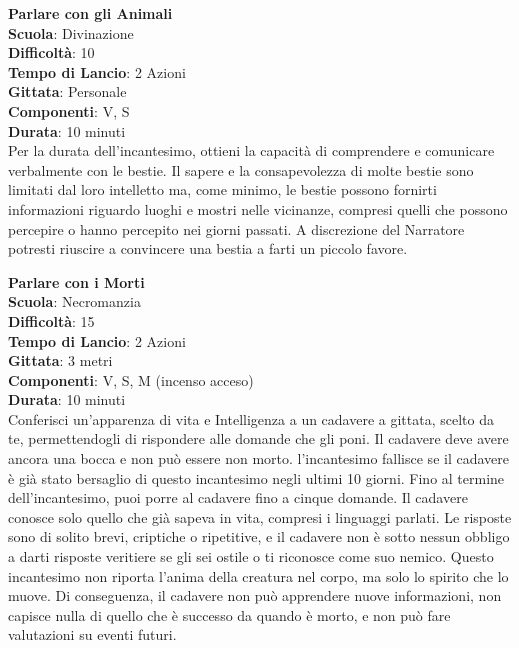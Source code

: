 \begin{multicols}{2}
\medskip\textbf{Parlare con gli Animali}\\
\textbf{Scuola}: Divinazione\\
\textbf{Difficoltà}:  10\\
\textbf{Tempo di Lancio}: 2 Azioni\\
\textbf{Gittata}: Personale\\
\textbf{Componenti}: V, S\\
\textbf{Durata}: 10 minuti\\
Per la durata dell'incantesimo, ottieni la capacità di comprendere e comunicare verbalmente con le bestie. Il sapere e la consapevolezza di molte bestie sono limitati dal loro intelletto ma, come minimo, le bestie possono fornirti informazioni riguardo luoghi e mostri nelle vicinanze, compresi quelli che possono percepire o hanno percepito nei giorni passati. A discrezione del Narratore potresti riuscire a convincere una bestia a farti un piccolo favore.

\medskip\textbf{Parlare con i Morti}\\
\textbf{Scuola}: Necromanzia\\
\textbf{Difficoltà}:  15\\
\textbf{Tempo di Lancio}: 2 Azioni\\
\textbf{Gittata}: 3 metri\\
\textbf{Componenti}: V, S, M (incenso acceso)\\
\textbf{Durata}: 10 minuti\\
Conferisci un'apparenza di vita e Intelligenza a un cadavere a gittata, scelto da te, permettendogli di rispondere alle domande che gli poni. Il cadavere deve avere ancora una bocca e non può essere non morto. l'incantesimo fallisce se il cadavere è già stato bersaglio di questo incantesimo negli ultimi 10 giorni. Fino al termine dell'incantesimo, puoi porre al cadavere fino a cinque domande. Il cadavere conosce solo quello che già sapeva in vita, compresi i linguaggi parlati. Le risposte sono di solito brevi, criptiche o ripetitive, e il cadavere non è sotto nessun obbligo a darti risposte veritiere se gli sei ostile o ti riconosce come suo nemico. Questo incantesimo non riporta l’anima della creatura nel corpo, ma solo lo spirito che lo muove. Di conseguenza, il cadavere non può apprendere nuove informazioni, non capisce nulla di quello che è successo da quando è morto, e non può fare valutazioni su eventi futuri.


\end{multicols}
